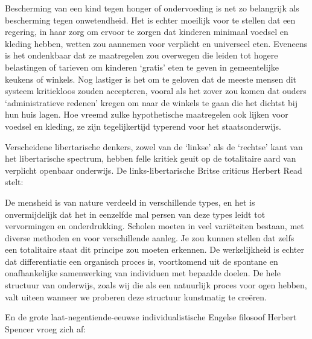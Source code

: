 \documentclass[
  a5paper,
  smalldemyvopaper,10pt,twoside,onecolumn,openright,extrafontsizes,hidelinks]{memoir}
\renewenvironment{quote}%
               {\list{}{\rightmargin=.6cm\leftmargin=.6cm}%
                \itshape \item[]}%
               {\endlist}
\begin{document}
\begin{quote}
Bescherming van een kind tegen honger of ondervoeding is net zo
belangrijk als bescherming tegen onwetendheid. Het is echter moeilijk
voor te stellen dat een regering, in haar zorg om ervoor te zorgen dat
kinderen minimaal voedsel en kleding hebben, wetten zou aannemen voor
verplicht en universeel eten. Eveneens is het ondenkbaar dat ze
maatregelen zou overwegen die leiden tot hogere belastingen of tarieven
om kinderen `gratis' eten te geven in gemeentelijke keukens of winkels.
Nog lastiger is het om te geloven dat de meeste mensen dit systeem
kritiekloos zouden accepteren, vooral als het zover zou komen dat ouders
`administratieve redenen' kregen om naar de winkels te gaan die het
dichtst bij hun huis lagen. Hoe vreemd zulke hypothetische maatregelen
ook lijken voor voedsel en kleding, ze zijn tegelijkertijd typerend voor
het staatsonderwijs.
\end{quote}

Verscheidene libertarische denkers, zowel van de `linkse' als de
`rechtse' kant van het libertarische spectrum, hebben felle kritiek
geuit op de totalitaire aard van verplicht openbaar onderwijs. De
links-libertarische Britse criticus Herbert Read stelt:

\begin{quote}
De mensheid is van nature verdeeld in verschillende types, en het is
onvermijdelijk dat het in eenzelfde mal persen van deze types leidt tot
vervormingen en onderdrukking. Scholen moeten in veel variëteiten
bestaan, met diverse methoden en voor verschillende aanleg. Je zou
kunnen stellen dat zelfs een totalitaire staat dit principe zou moeten
erkennen. De werkelijkheid is echter dat differentiatie een organisch
proces is, voortkomend uit de spontane en onafhankelijke samenwerking
van individuen met bepaalde doelen. De hele structuur van onderwijs,
zoals wij die als een natuurlijk proces voor ogen hebben, valt uiteen
wanneer we proberen deze structuur kunstmatig te creëren.
\end{quote}

En de grote laat-negentiende-eeuwse individualistische Engelse filosoof
Herbert Spencer vroeg zich af:
\end{document}
